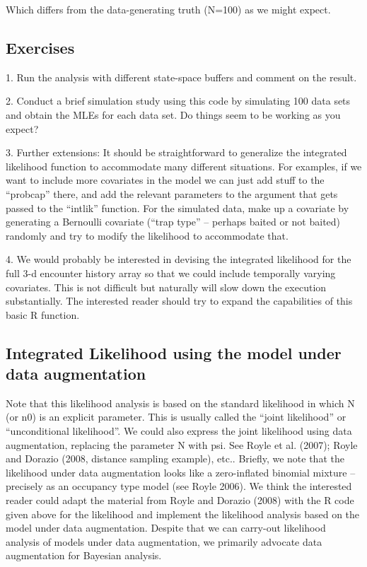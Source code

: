Which differs from the data-generating truth (N=100) as we might expect. 

\subsection{
Exercises}


1.	Run the analysis with different state-space buffers and comment on the result. 


2.	Conduct a brief simulation study using this code by simulating 100 data sets and obtain the MLEs for each data set. Do things seem to be working as you expect?


3.	Further extensions: It should be straightforward to generalize the integrated likelihood function to accommodate many different situations. For examples,  if we want to include more covariates in the model we can just add stuff to the “probcap” there, and add the relevant parameters to the argument that gets passed to the “intlik” function.  For the simulated data, make up a covariate by generating a Bernoulli covariate (“trap type” – perhaps baited or not baited) randomly and try to modify the likelihood to accommodate that. 



4.	We would probably be interested in devising the integrated likelihood for the full 3-d encounter history array so that we could include temporally varying covariates. This is not difficult but naturally will slow down the execution substantially. The interested reader should try to expand the capabilities of this basic R function.

\subsection{Integrated Likelihood using the model under data augmentation } 

Note that this likelihood analysis is based on the standard likelihood
in which N (or n0) is an explicit parameter. This is usually called
the “joint likelihood” or “unconditional likelihood”.  We could also
express the joint likelihood using data augmentation, replacing the
parameter N with psi. See Royle et al. (2007); Royle and Dorazio
(2008, distance sampling example), etc.. Briefly, we note that the
likelihood under data augmentation looks like a zero-inflated binomial
mixture – precisely as an occupancy type model (see Royle 2006).  We
think the interested reader could adapt the material from Royle and
Dorazio (2008) with the R code given above for the likelihood and
implement the likelihood analysis based on the model under data
augmentation. Despite that we can carry-out likelihood analysis of
models under data augmentation, we primarily advocate data
augmentation for Bayesian analysis.


